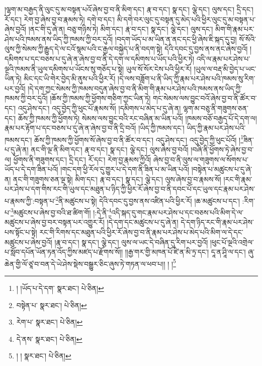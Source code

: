།ལྷག་མ་བརྒྱད་ནི་ལུང་དུ་མ་བསྟན་པའོ་ཞེས་བྱ་བ་ནི་མིག་དང་། རྣ་བ་དང་། སྣ་དང་། ལྕེ་དང་། ལུས་དང་། དྲི་དང་། རོ་དང་། རེག་བྱ་ཞེས་བྱ་བ་རྣམས་ཏེ། དགེ་བ་དང་། མི་དགེ་བར་ལུང་དུ་བསྟན་དུ་མེད་པའི་ཕྱིར་ལུང་དུ་མ་བསྟན་པ་ཞེས་བྱའོ། །ནང་གི་དུ་ཞེ་ན། བཅུ་གཉིས་ཏེ། མིག་དང་། རྣ་བ་དང་། སྣ་དང་། ལྕེ་དང་། ལུས་དང་། མིག་གི་རྣམ་པར་ཤེས་པའི་ཁམས་ནས་ཡིད་ཀྱི་ཁམས་ཀྱི་བར་དུའོ། །བདག་ཡོད་པ་མ་ཡིན་ན་ནང་དང་ཕྱི་ཞེས་ཇི་སྐད་དུ་བྱ། སོ་སོའི་ལུས་ཀྱི་སེམས་ཀྱི་རྒྱུད་དེ་ལ་ངའོ་སྙམ་པའི་ང་རྒྱལ་བསྐྱེད་པ་ནི་བདག་སྟེ། དེའི་དབང་དུ་བྱས་ནས་ནང་ཞེས་བྱའོ། །དམིགས་པ་དང་བཅས་པ་དུ་ཞེ་ན་ཞེས་བྱ་བ་ནི་དེ་དག་ལ་དམིགས་པ་ཡོད་པའི་ཕྱིར་ཏེ། འདི་ལ་རྣམ་པར་ཤེས་པ་ལྔའི་ཁམས་ནི་ཡུལ་དམིགས་པ་ཡོངས་སུ་གཅོད་པ་སྟེ། ཡུལ་སོ་སོར་ངེས་པའི་ཕྱིར་རོ། །ཡུལ་ལ་བརྡ་མི་བྱེད་པ་ཡང་ཡིན་ཏེ། མིང་དང་ཡི་གེར་བྱེད་མི་ནུས་པའི་ཕྱིར་རོ། །དེ་ལས་བཟློག་པ་ནི་ཡིད་ཀྱི་རྣམ་པར་ཤེས་པའི་ཁམས་སུ་རིག་པར་བྱའོ། །དེ་དག་ཀྱང་སེམས་ཀྱི་ཁམས་བདུན་ཞེས་བྱ་བ་ནི་མིག་གི་རྣམ་པར་ཤེས་པའི་ཁམས་ནས་ཡིད་ཀྱི་ཁམས་ཀྱི་བར་དུའོ། །ཆོས་ཀྱི་ཁམས་ཀྱི་ཕྱོགས་གཅིག་ཀྱང་ཡིན་ཏེ། གང་སེམས་ལས་བྱུང་བའོ་ཞེས་བྱ་བ་ནི་ཚོར་བ་དང་། འདུ་ཤེས་དང་། འདུ་བྱེད་ཀྱི་ཕུང་པོ་རྣམས་སོ། །དམིགས་པ་མེད་པ་དུ་ཞེ་ན། ལྷག་མ་བཅུ་ནི་གཟུགས་ཅན་དང་། ཆོས་ཀྱི་ཁམས་ཀྱི་ཕྱོགས་ཏེ། སེམས་ལས་བྱུང་བའི་རང་བཞིན་མ་ཡིན་པའོ། །ཁམས་བཅོ་བརྒྱད་པོ་དེ་དག་ལ། རྣམ་པར་རྟོག་པ་དང་བཅས་པ་དུ་ཞེ་ན་ཞེས་བྱ་བ་ནི་དྲི་བའོ། །ཡིད་ཀྱི་ཁམས་དང་། ཡིད་ཀྱི་རྣམ་པར་ཤེས་པའི་ཁམས་དང་། ཆོས་ཀྱི་ཁམས་ཀྱི་ཕྱོགས་སོ་ཞེས་བྱ་བ་ནི་ཚོར་བ་དང་། འདུ་ཤེས་དང་། འདུ་བྱེད་ཀྱི་ཕུང་པོའོ། །\footnote{། །ཡོད་པ་དེ་དག་  སྣར་ཐང་།  པེ་ཅིན། }ཟིན་པ་དུ་ཞེ་ན། ནང་གི་ལྔ་ནི་མིག་དང་། རྣ་བ་དང་། སྣ་དང་། ལྕེ་དང་། ལུས་ཞེས་བྱ་བའོ། །བཞི་ནི་ཕྱོགས་ཏེ་ཞེས་བྱ་བ་ལ། ཕྱོགས་ནི་གཟུགས་དང་། དྲི་དང་། རོ་དང་། རེག་བྱ་རྣམས་ཀྱིའོ། ཞེས་བྱ་བ་ནི་ལུས་ལ་གཟུགས་ལ་སོགས་པ་ཡོད་པ་དེ་དག་ཟིན་པའོ། །གང་དག་ཕྱི་རོལ་དུ་གྱུར་པ་དེ་དག་ནི་ཟིན་པ་མ་ཡིན་པའོ། །བསྟེན་པ་མཚུངས་པ་དུ་ཞེ་ན། ནང་གི་གཟུགས་ཅན་ལྔ་སྟེ། མིག་དང་། རྣ་བ་དང་། སྣ་དང་། ལྕེ་དང་། ལུས་ཞེས་བྱ་བ་རྣམས་སོ། །རང་གི་རྣམ་པར་ཤེས་པ་དག་གིས་རང་གི་ཡུལ་དང་མཐུན་པ་ཉིད་ཀྱི་ཕྱིར་རོ་ཞེས་བྱ་བ་ནི་དབང་པོ་དང་ཡུལ་དང་རྣམ་པར་ཤེས་པ་རྣམས་ཀྱི་:བསྟན་པ་\footnote{བསྟེན་པ་  སྣར་ཐང་།  པེ་ཅིན། }ནི་མཚུངས་པ་སྟེ། དེའི་དབང་དུ་བྱས་ནས་འཛིན་པའི་ཕྱིར་རོ། །ཆ་མཚུངས་པ་དང་། :རིག་པ་\footnote{རེག་པ་  སྣར་ཐང་།  པེ་ཅིན། }མཚུངས་པ་ཞེས་བྱ་བའི་ཐ་ཚིག་གོ། །:དེ་ནི་\footnote{དེ་ནས་  སྣར་ཐང་།  པེ་ཅིན། }འདི་སྐད་དུ་གང་རྣམ་པར་ཤེས་པ་དང་བཅས་པའི་མིག་དེ་ལ་མཚུངས་པ་ཞེས་བྱ་བར་བསྟན་པར་འགྱུར་རོ། །དེ་དག་དང་མཚུངས་པ་དུ་ཞེ་ན། དེ་དག་ཉིད་རང་གི་རྣམ་པར་ཤེས་པས་སྟོང་པ་སྟེ། རང་གི་རིགས་དང་མཐུན་པའི་ཕྱིར་རོ་ཞེས་བྱ་བ་ནི་རྣམ་པར་ཤེས་པ་མེད་པའི་མིག་ལ་དེ་དང་མཚུངས་པ་ཞེས་བྱའོ། །རྣ་བ་དང་། སྣ་དང་། ལྕེ་དང་། ལུས་ལ་ཡང་དེ་བཞིན་དུ་རིག་པར་བྱའོ། །ཕུང་པོ་ལྔའི་འགྲེལ་པ་སློབ་དཔོན་ཡོན་ཏན་འོད་ཀྱིས་མཛད་པ་རྫོགས་སོ།། །།རྒྱ་གར་གྱི་མཁན་པོ་ཛི་ན་མི་ཏྲ་དང་། དཱ་ན་ཤཱི་ལ་དང་། ཞུ་ཆེན་གྱི་ལོ་ཙཱ་བ་བན་དེ་ཡེ་ཤེས་སྡེས་བསྒྱུར་ཅིང་ཞུས་ཏེ་གཏན་ལ་ཕབ་པ།། །
།\footnote{། །  སྣར་ཐང་།  པེ་ཅིན། }